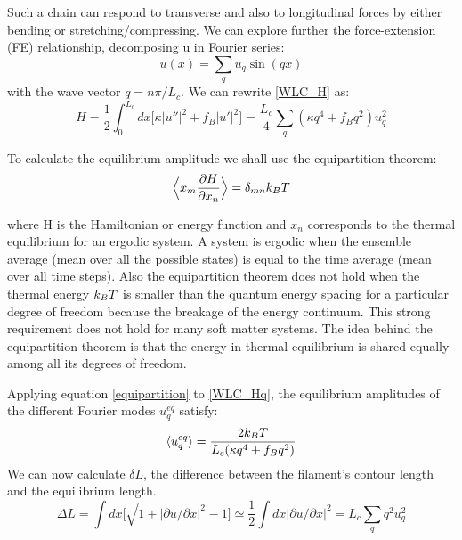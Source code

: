 Such a chain can respond to transverse and also to longitudinal forces by either
bending or stretching/compressing.  We can explore further the force-extension
(FE) relationship, decomposing u in Fourier series:
\begin{equation}\label{WLC_ufourier}
u(x)=\sum_q u_q \sin(qx)
\end{equation}
with the wave vector $q=n\pi/L_c$. We can rewrite \ref{WLC_H} as:
\begin{equation}\label{WLC_Hq}
H=\frac{1}{2}\int_0^{L_c} dx\Big[\kappa|u''|^2 + f_B|u'|^2\Big] =
\frac{L_c}{4}\sum_q (\kappa q^4 + f_Bq^2)u_q^2
\end{equation}

To calculate the equilibrium amplitude we shall use the equipartition theorem:
\begin{equation}\label{equipartition}
\Big\langle x_m\frac{\partial H}{\partial x_n} \Big\rangle= \delta_{mn}k_B{}T
\end{equation}

where H is the Hamiltonian or energy function and $x_n$ corresponds to the
thermal equilibrium for an ergodic system. A system is ergodic when
the ensemble average (mean over all the possible states) is equal to the time average (mean over all time
steps). Also the equipartition theorem does not hold when the
thermal energy $k_B{}T$ is smaller than the quantum energy spacing for a
particular degree of freedom because the breakage of the energy continuum. This
strong requirement does not hold for many soft matter systems. The idea behind
the equipartition theorem is that the energy in thermal equilibrium is shared
equally among all its degrees of freedom.

Applying equation \ref{equipartition} to \ref{WLC_Hq}, the equilibrium
amplitudes of the different Fourier modes $u_q^{eq} $ satisfy:
\begin{equation}\label{equipartition_uq}
\langle u_q^{eq}\rangle=\frac{2k_B{}T}{L_c(\kappa{}q^4+f_Bq^2)}
\end{equation}
We can now calculate $\delta L$, the difference between the filament's contour
length and the equilibrium length.
\begin{equation}\label{deltaL}
\Delta L= \int dx \Big[ \sqrt{1+|\partial u/\partial x|^2} -1\Big]\simeq
\frac{1}{2} \int dx |\partial u/\partial x|^2 = L_c \sum_q q^2 u_q^2
\end{equation}

